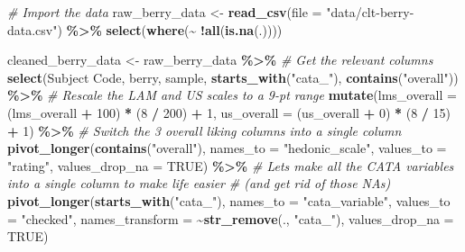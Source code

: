 \documentclass[
]{book}
\newenvironment{Shaded}{\begin{snugshade}}{\end{snugshade}}
\newcommand{\AttributeTok}[1]{\textcolor[rgb]{0.13,0.29,0.53}{#1}}
\newcommand{\CommentTok}[1]{\textcolor[rgb]{0.56,0.35,0.01}{\textit{#1}}}
\newcommand{\ConstantTok}[1]{\textcolor[rgb]{0.56,0.35,0.01}{#1}}
\newcommand{\DecValTok}[1]{\textcolor[rgb]{0.00,0.00,0.81}{#1}}
\newcommand{\FunctionTok}[1]{\textcolor[rgb]{0.13,0.29,0.53}{\textbf{#1}}}
\newcommand{\NormalTok}[1]{#1}
\newcommand{\OtherTok}[1]{\textcolor[rgb]{0.56,0.35,0.01}{#1}}
\newcommand{\SpecialCharTok}[1]{\textcolor[rgb]{0.81,0.36,0.00}{\textbf{#1}}}
\newcommand{\StringTok}[1]{\textcolor[rgb]{0.31,0.60,0.02}{#1}}
\begin{document}
\begin{Shaded}
\begin{Highlighting}[]
\CommentTok{\# Import the data}
\NormalTok{raw\_berry\_data }\OtherTok{\textless{}{-}} 
  \FunctionTok{read\_csv}\NormalTok{(}\AttributeTok{file =} \StringTok{"data/clt{-}berry{-}data.csv"}\NormalTok{) }\SpecialCharTok{\%\textgreater{}\%}
  \FunctionTok{select}\NormalTok{(}\FunctionTok{where}\NormalTok{(}\SpecialCharTok{\textasciitilde{}} \SpecialCharTok{!}\FunctionTok{all}\NormalTok{(}\FunctionTok{is.na}\NormalTok{(.)))) }

\NormalTok{cleaned\_berry\_data }\OtherTok{\textless{}{-}}
\NormalTok{  raw\_berry\_data }\SpecialCharTok{\%\textgreater{}\%}
  \CommentTok{\# Get the relevant columns}
  \FunctionTok{select}\NormalTok{(}\StringTok{\textasciigrave{}}\AttributeTok{Subject Code}\StringTok{\textasciigrave{}}\NormalTok{, }
\NormalTok{         berry,}
\NormalTok{         sample,}
         \FunctionTok{starts\_with}\NormalTok{(}\StringTok{"cata\_"}\NormalTok{), }
         \FunctionTok{contains}\NormalTok{(}\StringTok{"overall"}\NormalTok{)) }\SpecialCharTok{\%\textgreater{}\%}
  \CommentTok{\# Rescale the LAM and US scales to a 9{-}pt range}
  \FunctionTok{mutate}\NormalTok{(}\AttributeTok{lms\_overall =}\NormalTok{ (lms\_overall }\SpecialCharTok{+} \DecValTok{100}\NormalTok{) }\SpecialCharTok{*}\NormalTok{ (}\DecValTok{8} \SpecialCharTok{/} \DecValTok{200}\NormalTok{) }\SpecialCharTok{+} \DecValTok{1}\NormalTok{,}
         \AttributeTok{us\_overall =}\NormalTok{ (us\_overall }\SpecialCharTok{+} \DecValTok{0}\NormalTok{) }\SpecialCharTok{*}\NormalTok{ (}\DecValTok{8} \SpecialCharTok{/} \DecValTok{15}\NormalTok{) }\SpecialCharTok{+} \DecValTok{1}\NormalTok{) }\SpecialCharTok{\%\textgreater{}\%}
  \CommentTok{\# Switch the 3 overall liking columns into a single column}
  \FunctionTok{pivot\_longer}\NormalTok{(}\FunctionTok{contains}\NormalTok{(}\StringTok{"overall"}\NormalTok{),}
               \AttributeTok{names\_to =} \StringTok{"hedonic\_scale"}\NormalTok{,}
               \AttributeTok{values\_to =} \StringTok{"rating"}\NormalTok{,}
               \AttributeTok{values\_drop\_na =} \ConstantTok{TRUE}\NormalTok{) }\SpecialCharTok{\%\textgreater{}\%}
  \CommentTok{\# Let\textquotesingle{}s make all the CATA variables into a single column to make life easier}
  \CommentTok{\# (and get rid of those NAs)}
  \FunctionTok{pivot\_longer}\NormalTok{(}\FunctionTok{starts\_with}\NormalTok{(}\StringTok{"cata\_"}\NormalTok{),}
               \AttributeTok{names\_to =} \StringTok{"cata\_variable"}\NormalTok{,}
               \AttributeTok{values\_to =} \StringTok{"checked"}\NormalTok{,}
               \AttributeTok{names\_transform =} \SpecialCharTok{\textasciitilde{}}\FunctionTok{str\_remove}\NormalTok{(., }\StringTok{"cata\_"}\NormalTok{),}
               \AttributeTok{values\_drop\_na =} \ConstantTok{TRUE}\NormalTok{)}


\end{Highlighting}
\end{Shaded}
\end{document}
